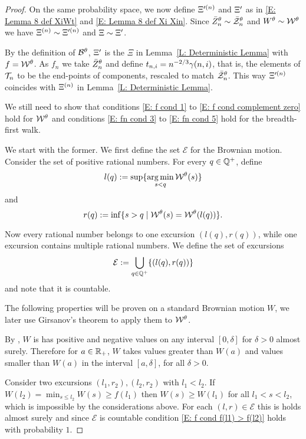 \begin{proof}
	On the same probability space, we now define $\Xi^{\prime (n)}$ and $\Xi^{\prime}$ as in \eqref{E: Lemma 8 def XiWt} and \eqref{E: Lemma 8 def Xi Xin}.
	Since $\bar{Z}^{\theta}_n \sim \bar{\mathcal{Z}}^{\theta}_n$ and $W^{\theta} \sim \mathcal{W}^{\theta}$ we have $\Xi^{(n)} \sim \Xi^{\prime (n)}$ and $\Xi \sim \Xi^{\prime}$.
	
	By the definition of $\mathcal{B}^{\theta}$, 
	$\Xi^{\prime}$ is the $\Xi$ in Lemma~\ref{L: Deterministic Lemma} with $f = \mathcal{W}^{\theta}$.
	As $f_n$ we take $\bar{Z}^{\theta}_n$ and define $t_{n, i} = n^{-2 / 3} \gamma(n,i)$, that is, 
	the elements of $\mathcal{T}_n$ to be the end-points of components,
	rescaled to match $\bar{\mathcal{Z}}^{\theta}_n$.
	This way $\Xi^{\prime (n)}$ coincides with $\Xi^{(n)}$ in Lemma~\ref{L: Deterministic Lemma}.
	
	We still need to show that conditions \eqref{E: f cond 1} to \eqref{E: f cond complement zero} hold for $\mathcal{W}^{\theta}$
	and conditions \eqref{E: fn cond 3} to \eqref{E: fn cond 5} hold for the breadth-first walk.
	
	We start with the former. 
	We first define the set $\mathcal{E}$ for the Brownian motion.
	Consider the set of positive rational numbers.
	For every $q \in \mathbb{Q}^+$, 
	define 
	\begin{equation}
		l(q) := \sup\{ \operatorname*{arg\,min}_{s < q} \mathcal{W}^{\theta}(s) \}
	\end{equation}
	and
	\begin{equation}
		r(q) := \inf\{ {s > q \; | \; \mathcal{W}^{\theta}(s) = \mathcal{W}^{\theta}(l(q))} \}.
	\end{equation}
	
	Now every rational number belongs to one excursion $(l(q), r(q))$,
	while one excursion contains multiple rational numbers.
	We define the set of excursions
	\begin{equation}
	\mathcal{E} := \bigcup_{q \in \mathbb{Q}^+} \{ (l(q), r(q)) \}
	\end{equation}
	and note that it is countable.
	
	The following properties will be proven on a standard Brownian motion $W$,
	we later use Girsanov's theorem to apply them to $\mathcal{W}^{\theta}$.
	
	By \cite[Theorem 2.8, p.38]{Morters.2010},
	$W$ is has positive and negative values on any interval $[0,\delta]$ for $\delta > 0$ almost surely.
	Therefore for $a \in \mathbb{R}_+$, 
	$W$ takes values greater than $W(a)$ and values smaller than $W(a)$ in the interval $[a,\delta]$,
	for all $\delta > 0$.
	
	Consider two excursions $(l_1, r_2), (l_2, r_2)$ with $l_1 < l_2$.
	If $W(l_2) = \min_{s \leq l_2} W(s) \geq f(l_1)$ then $W(s) \geq W(l_1)$ for all $l_1 < s < l_2$,
	which is impossible by the considerations above.
	For each $(l,r) \in \mathcal{E}$ this is holds almost surely
	and since $\mathcal{E}$ is countable
	condition \eqref{E: f cond f(l1) > f(l2)} holds with probability $1$.
	

\end{proof}
